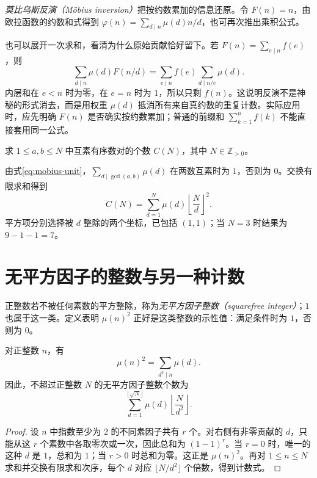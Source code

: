 \emph{莫比乌斯反演（Möbius inversion）}把按约数累加的信息还原。令 $F(n)=n$，由欧拉函数的约数和式得到 $\varphi(n)=\sum_{d\mid n}\mu(d)n/d$，也可再次推出乘积公式。

也可以展开一次求和，看清为什么原始贡献恰好留下。若 $F(n)=\sum_{e\mid n}f(e)$，则
\[
 \sum_{d\mid n}\mu(d)F(n/d)
 =\sum_{e\mid n}f(e)\sum_{d\mid n/e}\mu(d).
\]
内层和在 $e<n$ 时为零，在 $e=n$ 时为 $1$，所以只剩 $f(n)$。这说明反演不是神秘的形式消去，而是用权重 $\mu(d)$ 抵消所有来自真约数的重复计数。实际应用时，应先明确 $F(n)$ 是否确实按约数累加；普通的前缀和 $\sum_{k=1}^n f(k)$ 不能直接套用同一公式。

\begin{example}
求 $1\le a,b\le N$ 中互素有序数对的个数 $C(N)$，其中 $N\in\mathbb Z_{>0}$。
\end{example}
\begin{solve}
由式\eqref{eq:mobius-unit}，$\sum_{d\mid\gcd(a,b)}\mu(d)$ 在两数互素时为 $1$，否则为 $0$。交换有限求和得到
\begin{equation}
 C(N)=\sum_{d=1}^N\mu(d)\left\lfloor\frac Nd\right\rfloor^2.
 \label{eq:coprime-pairs}
\end{equation}
平方项分别选择被 $d$ 整除的两个坐标，已包括 $(1,1)$；当 $N=3$ 时结果为 $9-1-1=7$。
\end{solve}

\section{无平方因子的整数与另一种计数}

正整数若不被任何素数的平方整除，称为\emph{无平方因子整数（squarefree integer）}；$1$ 也属于这一类。定义表明 $\mu(n)^2$ 正好是这类整数的示性值：满足条件时为 $1$，否则为 $0$。

\begin{proposition}
\label{prop:squarefree-count}
对正整数 $n$，有
\[
 \mu(n)^2=\sum_{d^2\mid n}\mu(d).
\]
因此，不超过正整数 $N$ 的无平方因子整数个数为
\[
 \sum_{d=1}^{\lfloor\sqrt N\rfloor}\mu(d)
 \left\lfloor\frac{N}{d^2}\right\rfloor.
\]
\end{proposition}
\begin{proof}
设 $n$ 中指数至少为 $2$ 的不同素因子共有 $r$ 个。对右侧有非零贡献的 $d$，只能从这 $r$ 个素数中各取零次或一次，因此总和为 $(1-1)^r$。当 $r=0$ 时，唯一的这种 $d$ 是 $1$，总和为 $1$；当 $r>0$ 时总和为零。这正是 $\mu(n)^2$。再对 $1\le n\le N$ 求和并交换有限求和次序，每个 $d$ 对应 $\lfloor N/d^2\rfloor$ 个倍数，得到计数式。
\end{proof}

